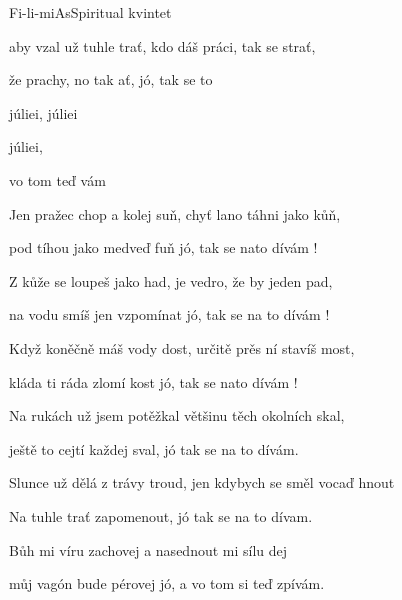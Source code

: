 \setcounter{page}{24}
\begin{song}{Fi-li-mi}{As}{Spiritual kvintet}
\begin{SBVerse}
 aby vzal už tuhle trať, kdo dáš práci, tak se strať,

že  prachy, no tak ať, jó, tak se to 


\end{SBVerse}
\begin{SBChorus}
 júliei,  júliei

 júliei,

vo tom teď vám
\end{SBChorus}
\begin{SBVerse}
Jen pražec chop a kolej suň, chyť lano táhni jako kůň, 

pod tíhou jako medveď fuň jó, tak se nato dívám !
\end{SBVerse}
\begin{SBVerse}
Z kůže se loupeš jako had, je vedro, že by jeden pad, 

na vodu smíš jen vzpomínat jó, tak se na to dívám !
\end{SBVerse}
\begin{SBChorus}
\end{SBChorus}
\begin{SBVerse}
Když koněčně máš vody dost, určitě prěs ní stavíš most, 

kláda ti ráda zlomí kost jó, tak se nato dívám ! 

\end{SBVerse}
\begin{SBChorus}
\end{SBChorus}
\begin{SBVerse}
Na rukách už jsem potěžkal většinu těch okolních skal, 

ještě to cejtí každej sval, jó tak se na to dívám.

\end{SBVerse}
\begin{SBChorus}
\end{SBChorus}
\begin{SBVerse}
Slunce už dělá z trávy troud, jen kdybych se směl vocaď hnout

Na tuhle trať zapomenout, jó tak se na to dívam.
\end{SBVerse}
\begin{SBChorus}
\end{SBChorus}
\begin{SBVerse}
Bůh mi víru zachovej a nasednout mi sílu dej

můj vagón bude pérovej jó, a vo tom si teď zpívám.
\end{SBVerse}
\begin{SBChorus}
\end{SBChorus}
\end{song}

\pagebreak
